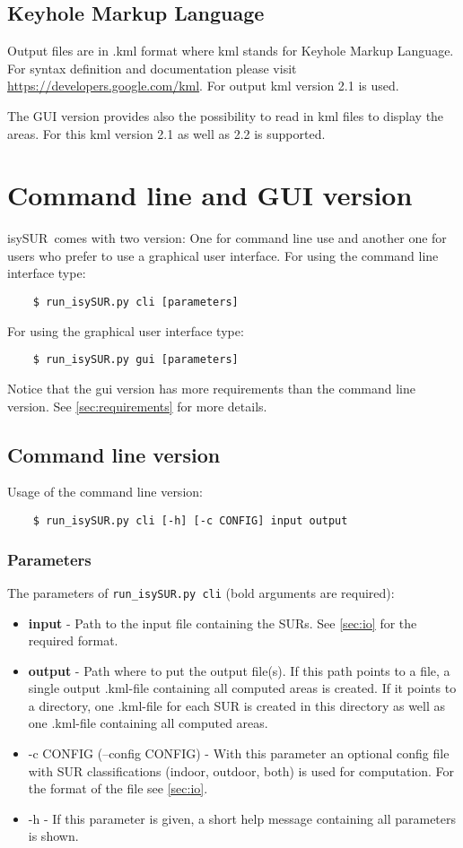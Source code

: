 \documentclass[11pt,fleqn]{book} %
\newcommand{\ProjectTitle}{isySUR}
\newcommand{\pt}{\ProjectTitle}
\begin{document}
\subsection{Keyhole Markup Language}
Output files are in .kml format where kml stands for Keyhole Markup Language. For syntax definition and documentation please visit \url{https://developers.google.com/kml}. For output kml version 2.1 is used.

The GUI version provides also the possibility to read in kml files to display the areas. For this kml version 2.1 as well as 2.2 is supported.

\section{Command line and GUI version}\label{sec:usage}
\pt\ comes with two version: One for command line use and another one for users who prefer to use a graphical user interface.
For using the command line interface type:
\begin{verbatim}
	$ run_isySUR.py cli [parameters]
\end{verbatim}
For using the graphical user interface type:
\begin{verbatim}
	$ run_isySUR.py gui [parameters]
\end{verbatim}

Notice that the gui version has more requirements than the command line version. See \ref{sec:requirements} for more details.

\subsection{Command line version}\label{sec:cli}
Usage of the command line version:
\begin{verbatim}
	$ run_isySUR.py cli [-h] [-c CONFIG] input output
\end{verbatim}

\subsubsection{Parameters}
The parameters of \texttt{run\_isySUR.py cli} (bold arguments are required):
\begin{itemize}
	\item \textbf{input} - Path to the input file containing the SURs. See \ref{sec:io} for the required format.
	\item \textbf{output} - Path where to put the output file(s). If this path points to a file, a single output .kml-file containing all computed areas is created. If it points to a directory, one .kml-file for each SUR is created in this directory as well as one .kml-file containing all computed areas.
	\item -c CONFIG (--config CONFIG) - With this parameter an optional config file with SUR classifications (indoor, outdoor, both) is used for computation. For the format of the file see \ref{sec:io}.
	\item -h - If this parameter is given, a short help message containing all parameters is shown.
\end{itemize}
\end{document}
